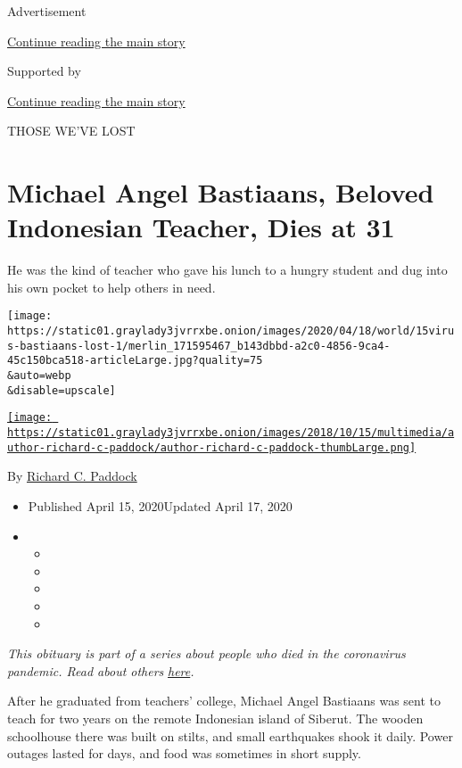 Advertisement

\protect\hyperlink{after-top}{Continue reading the main story}

Supported by

\protect\hyperlink{after-sponsor}{Continue reading the main story}

THOSE WE'VE LOST

\hypertarget{michael-angel-bastiaans-beloved-indonesian-teacher-dies-at-31}{%
\section{Michael Angel Bastiaans, Beloved Indonesian Teacher, Dies at
31}\label{michael-angel-bastiaans-beloved-indonesian-teacher-dies-at-31}}

He was the kind of teacher who gave his lunch to a hungry student and
dug into his own pocket to help others in need.

\texttt{[image: https://static01.graylady3jvrrxbe.onion/images/2020/04/18/world/15virus-bastiaans-lost-1/merlin\_171595467\_b143dbbd-a2c0-4856-9ca4-45c150bca518-articleLarge.jpg?quality=75\\\&auto=webp\\\&disable=upscale]}

\href{https://www.nytimes3xbfgragh.onion/by/richard-c-paddock}{\texttt{[image: https://static01.graylady3jvrrxbe.onion/images/2018/10/15/multimedia/author-richard-c-paddock/author-richard-c-paddock-thumbLarge.png]}}

By
\href{https://www.nytimes3xbfgragh.onion/by/richard-c-paddock}{Richard
C. Paddock}

\begin{itemize}
\item
  Published April 15, 2020Updated April 17, 2020
\item
  \begin{itemize}
  \item
  \item
  \item
  \item
  \item
  \end{itemize}
\end{itemize}

\emph{This obituary is part of a series about people who died in the
coronavirus pandemic. Read about others}
\href{https://www.nytimes3xbfgragh.onion/series/people-who-have-died-of-the-coronavirus}{\emph{here}}\emph{.}

After he graduated from teachers' college, Michael Angel Bastiaans was
sent to teach for two years on the remote Indonesian island of Siberut.
The wooden schoolhouse there was built on stilts, and small earthquakes
shook it daily. Power outages lasted for days, and food was sometimes in
short supply.

